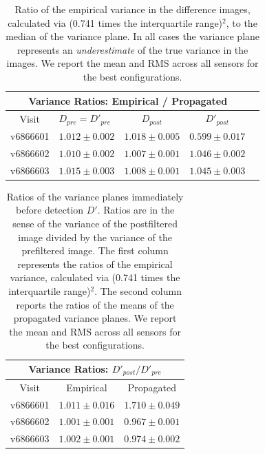 \documentclass[prd, nofootinbib, floatfix, 11pt,tightenlines,times]{article}
\begin{document}
\begin{table}
\centering
\begin{tabular}{clccc}
\hline
\multicolumn{4}{|c|}{Variance Ratios: Empirical / Propagated} \\
\hline
Visit    & $D_{pre} = D'_{pre}$ & $D_{post}$ & $D'_{post}$ \\
\hline
v6866601 &$1.012 \pm 0.002$&$1.018 \pm 0.005$&$0.599 \pm 0.017$ \\
v6866602 &$1.010 \pm 0.002$&$1.007 \pm 0.001$&$1.046 \pm 0.002$ \\
v6866603 &$1.015 \pm 0.003$&$1.008 \pm 0.001$&$1.045 \pm 0.003$ \\
\end{tabular}
\caption{Ratio of the empirical variance in the difference images,
  calculated via (0.741 times the interquartile range)$^2$, to the
  median of the variance plane.  In all cases the variance plane
  represents an {\it underestimate} of the true variance in the
  images.  We report the mean and RMS across all sensors for the best
  configurations.  }
\label{tab-variance1}
\end{table}

\begin{table}
\centering
\begin{tabular}{ccc}
\hline
\multicolumn{3}{|c|}{Variance Ratios: $D'_{post} / D'_{pre}$} \\
\hline
Visit    & Empirical & Propagated \\
\hline
v6866601 & $1.011 \pm 0.016$    & $1.710 \pm 0.049$    \\
v6866602 & $1.001 \pm 0.001$    & $0.967 \pm 0.001$    \\
v6866603 & $1.002 \pm 0.001$    & $0.974 \pm 0.002$    \\
\end{tabular}
\caption{Ratios of the variance planes immediately before detection
  $D'$.  Ratios are in the sense of the variance of the postfiltered
  image divided by the variance of the prefiltered image.  The first
  column represents the ratios of the empirical variance, calculated
  via (0.741 times the interquartile range)$^2$.  The second column
  reports the ratios of the means of the propagated variance planes.
  We report the mean and RMS across all sensors for the best
  configurations.}
\label{tab-variance2}
\end{table}
\end{document}
